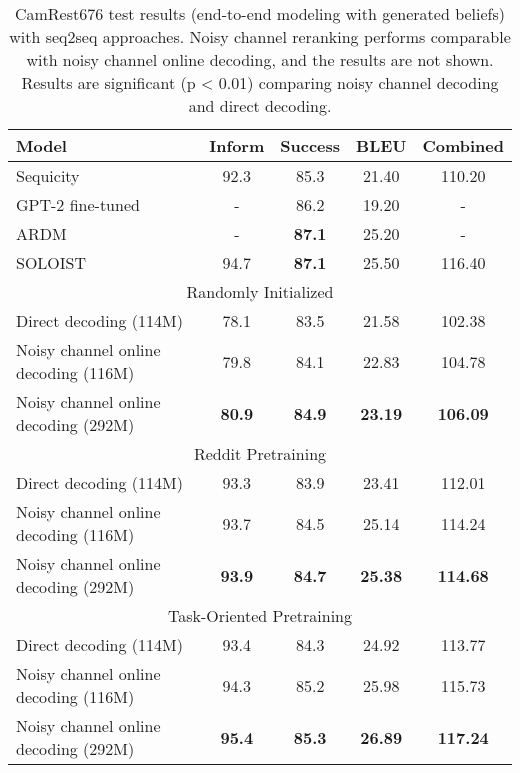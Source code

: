 \documentclass[11pt,a4paper]{article}
\begin{document}
\begin{table*}[t]
    \centering
    \footnotesize
    \renewcommand{\arraystretch}{0.9}
    \begin{tabular}{lcccc}
        \toprule
        \textbf{Model}   & \textbf{Inform } & \textbf{Success } &
        \textbf{BLEU } &
        \textbf{Combined } \\ \midrule
        Sequicity \cite{lei2018sequicity} & 92.3 & 85.3 & 21.40 & 110.20 \\
        GPT-2 fine-tuned \cite{wu2019alternating} & - & 86.2 & 19.20 & - \\
        ARDM \cite{wu2019alternating} & - & \textbf{87.1} & 25.20 & - \\
        SOLOIST \cite{peng2020soloist} & 94.7 & \textbf{87.1} & 25.50 & 116.40 \\ \midrule
       \multicolumn{5}{c}{Randomly Initialized} \\ \midrule
        Direct decoding (114M) & 78.1 & 83.5 & 21.58 & 102.38 \\
Noisy channel online decoding (116M) & 79.8 & 84.1 & 22.83 & 104.78\\
Noisy channel online decoding (292M) & \textbf{80.9} & \textbf{84.9} & \textbf{23.19} & \textbf{106.09} \\
        \midrule\multicolumn{5}{c}{Reddit Pretraining} \\ \midrule
        Direct decoding (114M) & 93.3 & 83.9 & 23.41 & 112.01 \\
Noisy channel online decoding (116M) & 93.7 & 84.5 & 25.14 & 114.24\\
Noisy channel online decoding (292M) & \textbf{93.9} & \textbf{84.7} & \textbf{25.38} & \textbf{114.68} \\
 \midrule
        \multicolumn{5}{c}{Task-Oriented Pretraining} \\ \midrule
        Direct decoding (114M) & 93.4 & 84.3 & 24.92 & 113.77 \\
Noisy channel online decoding (116M) & 94.3 & 85.2 & 25.98 &	115.73\\
Noisy channel online decoding (292M) & \textbf{95.4} & \textbf{85.3} & \textbf{26.89} & \textbf{117.24} \\
    \bottomrule
    \end{tabular}
\caption{CamRest676 test results (end-to-end modeling with generated beliefs) with seq2seq approaches. Noisy channel reranking performs comparable with noisy channel online decoding, and the results are not shown. Results are significant (p < 0.01) comparing noisy channel decoding and direct decoding. \label{tab:camrest676_end2end}}
\end{table*}
\end{document}
